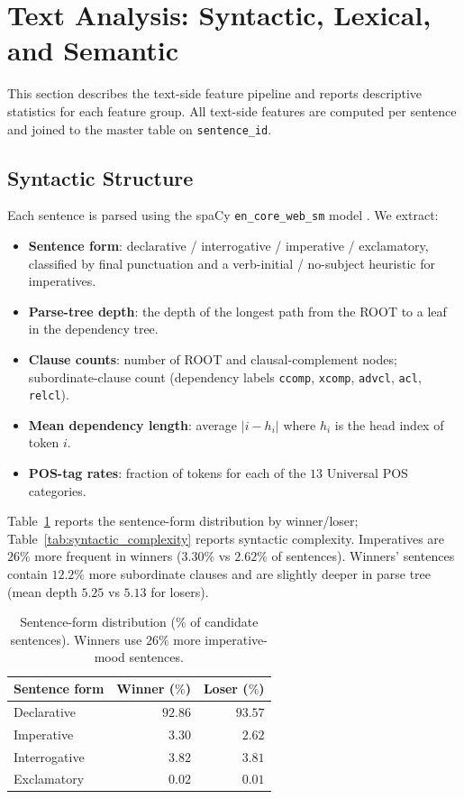 \documentclass[journal]{IEEEtran}
\begin{document}
\section{Text Analysis: Syntactic, Lexical, and Semantic}
\label{sec:text}

This section describes the text-side feature pipeline and reports
descriptive statistics for each feature group. All text-side features
are computed per sentence and joined to the master table on
\texttt{sentence\_id}.

\subsection{Syntactic Structure}

Each sentence is parsed using the spaCy \texttt{en\_core\_web\_sm}
model \cite{honnibal2020spacy}. We extract:

\begin{itemize}
  \item \textbf{Sentence form}: declarative / interrogative /
        imperative / exclamatory, classified by final punctuation and
        a verb-initial / no-subject heuristic for imperatives.
  \item \textbf{Parse-tree depth}: the depth of the longest path from
        the ROOT to a leaf in the dependency tree.
  \item \textbf{Clause counts}: number of ROOT and clausal-complement
        nodes; subordinate-clause count (dependency labels
        \texttt{ccomp}, \texttt{xcomp}, \texttt{advcl}, \texttt{acl},
        \texttt{relcl}).
  \item \textbf{Mean dependency length}: average $\lvert i - h_i\rvert$
        where $h_i$ is the head index of token $i$.
  \item \textbf{POS-tag rates}: fraction of tokens for each of the
        $13$ Universal POS categories.
\end{itemize}

Table~\ref{tab:syntactic_form} reports the sentence-form distribution
by winner/loser; Table~\ref{tab:syntactic_complexity} reports
syntactic complexity. Imperatives are $26\%$ more frequent in winners
($3.30\%$ vs $2.62\%$ of sentences). Winners' sentences contain
$12.2\%$ more subordinate clauses and are slightly deeper in parse
tree (mean depth $5.25$ vs $5.13$ for losers).

\begin{table}[t]
\caption{Sentence-form distribution (\% of candidate sentences).
Winners use $26\%$ more imperative-mood sentences.}
\label{tab:syntactic_form}
\centering
\begin{tabular}{lrr}
\toprule
Sentence form     & Winner ($\%$) & Loser ($\%$) \\
\midrule
Declarative       & $92.86$ & $93.57$ \\
Imperative        & $3.30$  & $2.62$ \\
Interrogative     & $3.82$  & $3.81$ \\
Exclamatory       & $0.02$  & $0.01$ \\
\bottomrule
\end{tabular}
\end{table}
\end{document}
